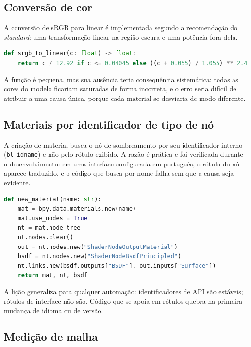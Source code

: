 \subsection{Convers\~ao de cor}

A convers\~ao de sRGB para linear \'e implementada segundo a recomenda{\c{c}}\~ao do
\emph{standard}: uma transforma{\c{c}}\~ao linear na regi\~ao escura e uma pot\^encia fora dela.

\begin{lstlisting}[language=Python]
def srgb_to_linear(c: float) -> float:
    return c / 12.92 if c <= 0.04045 else ((c + 0.055) / 1.055) ** 2.4
\end{lstlisting}

A fun{\c{c}}\~ao \'e pequena, mas sua aus\^encia teria consequ\^encia sistem\'atica: todas as
cores do modelo ficariam saturadas de forma incorreta, e o erro seria dif\'icil de atribuir a
uma causa \'unica, porque cada material se desviaria de modo diferente.

\subsection{Materiais por identificador de tipo de n\'o}

A cria{\c{c}}\~ao de material busca o n\'o de sombreamento por seu identificador interno
(\texttt{bl\_idname}) e n\~ao pelo r\'otulo exibido. A raz\~ao \'e pr\'atica e foi verificada
durante o desenvolvimento: em uma interface configurada em portugu\^es, o r\'otulo do n\'o
aparece traduzido, e o c\'odigo que busca por nome falha sem que a causa seja evidente.

\begin{lstlisting}[language=Python]
def new_material(name: str):
    mat = bpy.data.materials.new(name)
    mat.use_nodes = True
    nt = mat.node_tree
    nt.nodes.clear()
    out = nt.nodes.new("ShaderNodeOutputMaterial")
    bsdf = nt.nodes.new("ShaderNodeBsdfPrincipled")
    nt.links.new(bsdf.outputs["BSDF"], out.inputs["Surface"])
    return mat, nt, bsdf
\end{lstlisting}

A li{\c{c}}\~ao generaliza para qualquer automa{\c{c}}\~ao: identificadores de API s\~ao
est\'aveis; r\'otulos de interface n\~ao s\~ao. C\'odigo que se apoia em r\'otulos quebra na
primeira mudan{\c{c}}a de idioma ou de vers\~ao.

\subsection{Medi{\c{c}}\~ao de malha}

